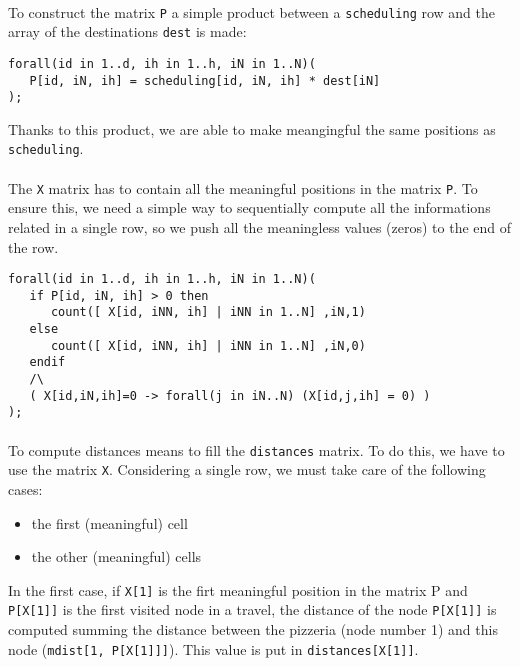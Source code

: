 \documentclass[10pt]{article}
\begin{document}
	\paragraph*{}
	To construct the matrix \texttt{P} a simple product between a \texttt{scheduling} row and the array of the destinations \texttt{dest} is
	made:\\
	\begin{verbatim}
forall(id in 1..d, ih in 1..h, iN in 1..N)(
   P[id, iN, ih] = scheduling[id, iN, ih] * dest[iN]
);
	\end{verbatim}
	
	Thanks to this product, we are able to make meangingful the same positions
	as \texttt{scheduling}.

	\paragraph*{}
	The \texttt{X} matrix has to contain all the meaningful	positions in the matrix
	\texttt{P}. To ensure this, we need a simple way to sequentially compute all the
	informations related in a single row, so we push all the meaningless values (zeros)
	to the end of the row. \\ 
	\begin{verbatim}
forall(id in 1..d, ih in 1..h, iN in 1..N)(
   if P[id, iN, ih] > 0 then
      count([ X[id, iNN, ih] | iNN in 1..N] ,iN,1) 
   else
      count([ X[id, iNN, ih] | iNN in 1..N] ,iN,0)
   endif
   /\
   ( X[id,iN,ih]=0 -> forall(j in iN..N) (X[id,j,ih] = 0) )
);
	\end{verbatim}


	\paragraph*{}
	To compute distances means to fill the \texttt{distances} matrix.
    To do this, we have to use the matrix \texttt{X}. 
	Considering a single row, we must take care of the following cases:
	\begin{itemize}
		\item the first (meaningful) cell
		\item the other (meaningful) cells
	\end{itemize}
	
	In the first case, if \texttt{X[1]} is the firt meaningful position in the 
	matrix P and \texttt{P[X[1]]} is the first visited node in a travel,
	the distance of the node \texttt{P[X[1]]} is computed summing the 
	distance between the pizzeria (node number 1) and this node (\texttt{mdist[1, P[X[1]]]}).
	This value is put in \texttt{distances[X[1]]}.\\
	
\end{document}
